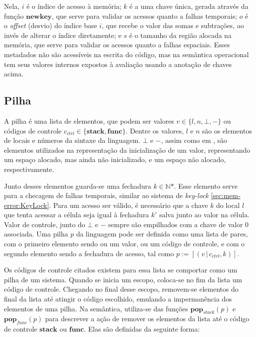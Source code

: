 Nela, $i$ é o índice de acesso à memória; $k$ é a uma chave única, gerada através da função $\mathbf{newkey}$, que serve para validar os acessos quanto a falhas temporais; $o$ é o \emph{offset} (desvio) do índice base $i$, que recebe o valor das somas e subtrações, ao invés de alterar o índice diretamente; e $s$ é o tamanho da região alocada na memória, que serve para validar os acessos quanto a falhas espaciais. Esses metadados não são acessíveis na escrita do código, mas na semântica operacional tem seus valores internos expostos à avaliação usando a anotação de chaves acima.

\subsection{Pilha}

A pilha é uma lista de elementos, que podem ser valores $v \in \{l, n, \bot, -\}$ ou códigos de controle $c_{ctrl} \in \{\mathbf{stack},\mathbf{func}\}$. Dentre os valores, $l$ e $n$ são os elementos de locais e números da sintaxe da linguagem. $\bot$ e $-$, assim como em \citet{WESSEL2019}, são elementos utilizados na representação da inicialização de um valor, representando um espaço alocado, mas ainda não inicializado, e um espaço não alocado, respectivamente. 

Junto desses elementos guarda-se uma fechadura $k \in \mathbb{N}\text{*}$. Esse elemento serve para a checagem de falhas temporais, similar ao sistema de \emph{key-lock} \ref{sec:mem-error:KeyLock}. Para um acesso ser válido, é necessário que a chave $k$ do local $l$ que tenta acessar a célula seja igual à fechadura $k'$ salva junto ao valor na célula. Valor de controle, junto do $\bot$ e $-$ sempre são empilhados com a chave de valor 0 associada. Uma pilha $p$ da linguagem pode ser definida como uma lista de pares, com o primeiro elemento sendo ou um valor, ou um código de controle, e com o segundo elemento sendo a fechadura de acesso, tal como $p := [(v\,|\,c_{ctrl}, k)]$.

Os códigos de controle citados existem para essa lista se comportar como um pilha de um sistema. Quando se inicia um escopo, coloca-se no fim da lista um código de controle. Chegando no final desse escopo, removem-se elementos do final da lista até atingir o código escolhido, emulando a impermanência dos elementos de uma pilha. Na semântica, utiliza-se das funções $\mathbf{pop}_{stack}(p)$ e $\mathbf{pop}_{func}(p)$ para descrever a ação de remover os elementos da lista até o código de controle $\mathbf{stack}$ ou $\mathbf{func}$. Elas são definidas da seguinte forma:


